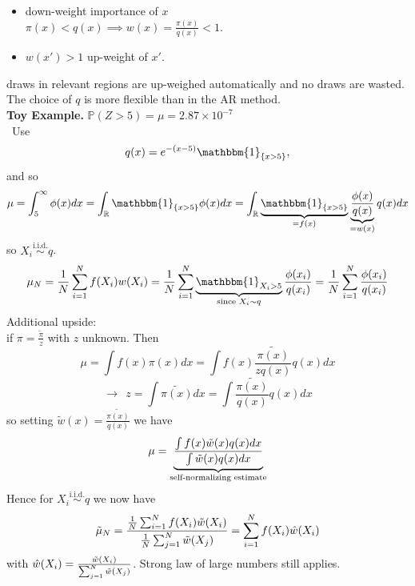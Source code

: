 \documentclass{article}
\begin{document}
\begin{itemize}
    \item down-weight importance of $x$\\
    $\pi (x) < q(x) \implies w(x) = \frac{\pi (x)}{q(x)}< 1$. 
    \item $w(x')>1$ up-weight of $x'$.
\end{itemize}
draws in relevant regions are up-weighed automatically and no draws are wasted. The choice of $q$ is more flexible than in the AR method.\\ 
\textbf{Toy Example.} $\mathbb{P}(Z>5) = \mu= 2.87 \times 10 ^{-7}$\\\
Use 
\begin{equation*}
    q(x)= e ^{-(x-5)} \mathbbm{1}_{\{x>5\}},
\end{equation*}
and so 
\begin{equation*}
    \mu = \int_5^{\infty} \phi(x) dx= \int_{\mathbb{R}} \mathbbm{1}_{\{x>5\}} \phi(x) dx = \int_{\mathbb{R}} \underbrace{\mathbbm{1}_{\{x>5\}}}_{= f(x)} \underbrace{\frac{\phi(x)}{q(x)}}_{=w(x)} q(x) dx
\end{equation*}
so $X_i \stackrel{\text{i.i.d.}}{\sim} q $.
\begin{equation*}
    \mu_N= \frac{1}{N} \sum_{i=1}^N f(X_i)w(X_i) = \frac{1}{N} \sum_{i=1}^N \underbrace{\mathbbm{1}_{X_i>5} }_{\text{since } X_i \sim q }\frac{\phi(x_i)}{q(x_i)}  = \frac{1}{N} \sum_{i=1}^N\frac{\phi(x_i)}{q(x_i)} 
\end{equation*}
Additional upside:\\
if $\pi= \frac{\tilde{\pi}}{z}$ with $z$ unknown. Then
\begin{equation*}
    \mu = \int f(x) \pi (x) dx = \int f(x)\frac{\tilde{\pi(x)}}{z q(x)} q(x) dx 
\end{equation*}
\begin{equation*}
    \rightarrow \ \ z= \int \tilde{\pi(x)} dx = \int \frac{\tilde{\pi(x)}}{q(x)}q(x) dx 
\end{equation*}
so setting $\tilde{w}(x)=\frac{\tilde{\pi(x)}}{q(x)}$ we have 
\begin{equation*}
     \mu = \underbrace{\frac{\int f(x) \Tilde{w}(x) q(x) dx }{\int \Tilde{w}(x) q(x) dx}}_{\text{self-normalizing estimate}}
\end{equation*}
Hence for $X_i \stackrel{\text{i.i.d.}}{\sim} q $ we now have 
\begin{equation*}
    \Tilde{\mu}_N = \frac{\frac{1}{N} \sum_{i=1}^N f(X_i)\Tilde{w}(X_i)}{\frac{1}{N} \sum_{j=1}^N \Tilde{w}(X_j)} = \sum_{i=1}^N  f(X_i) \hat{w}(X_i)
\end{equation*}
with $\hat{w}(X_i)= \frac{\Tilde{w}(X_i)}{\sum_{j=1}^N \Tilde{w}(X_j)}$. Strong law of large numbers still applies. \\
\end{document}
